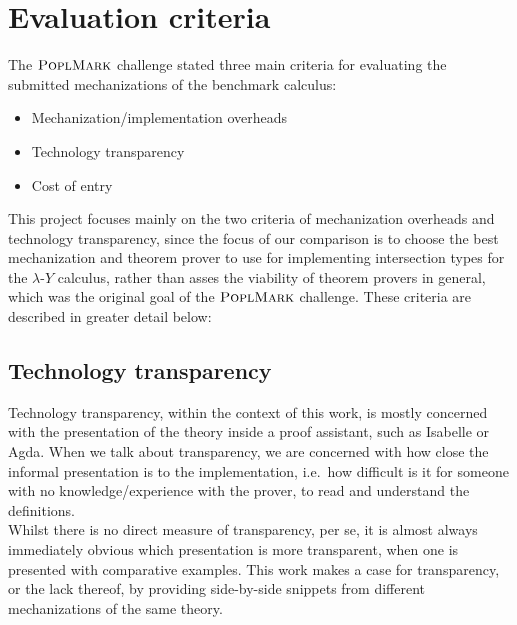 \documentclass[a4paper, 12pt, twoside]{style/ociamthesis}
\theoremstyle{plain}
\theoremstyle{definition}
\theoremstyle{remark}
\providecommand{\tightlist}{%
  \setlength{\itemsep}{0pt}\setlength{\parskip}{0pt}}
\newcommand{\lamy}{\lambda\text{-}Y}
\newcommand{\poplm}{\textsc{PoplMark}}
\begin{document}
\section{Evaluation criteria}\label{evaluation-criteria}

The \(\poplm\) challenge stated three main criteria for evaluating the
submitted mechanizations of the benchmark calculus:

\begin{itemize}
\tightlist
\item
  Mechanization/implementation overheads
\item
  Technology transparency
\item
  Cost of entry
\end{itemize}

This project focuses mainly on the two criteria of mechanization
overheads and technology transparency, since the focus of our comparison
is to choose the best mechanization and theorem prover to use for
implementing intersection types for the \(\lamy\) calculus, rather than
asses the viability of theorem provers in general, which was the
original goal of the \(\poplm\) challenge. These criteria are described
in greater detail below:

\subsection{Technology transparency}\label{technology-transparency}

Technology transparency, within the context of this work, is mostly
concerned with the presentation of the theory inside a proof assistant,
such as Isabelle or Agda. When we talk about transparency, we are
concerned with how close the informal presentation is to the
implementation, i.e.~how difficult is it for someone with no
knowledge/experience with the prover, to read and understand the
definitions.\\
Whilst there is no direct measure of transparency, per se, it is almost
always immediately obvious which presentation is more transparent, when
one is presented with comparative examples. This work makes a case for
transparency, or the lack thereof, by providing side-by-side snippets
from different mechanizations of the same theory.
\end{document}
